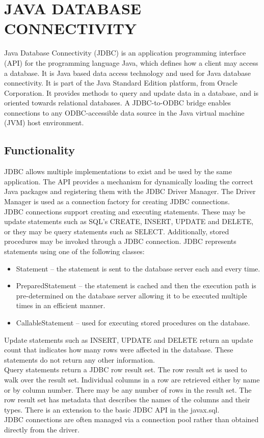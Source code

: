 \chapter{JAVA DATABASE CONNECTIVITY}
Java Database Connectivity (JDBC) is an application programming interface (API) for the programming language Java, which defines how a client may access a database. It is Java based data access technology and used for Java database connectivity. It is part of the Java Standard Edition platform, from Oracle Corporation. It provides methods to query and update data in a database, and is oriented towards relational databases. A JDBC-to-ODBC bridge enables connections to any ODBC-accessible data source in the Java virtual machine (JVM) host environment.\\
\section{Functionality}
JDBC allows multiple implementations to exist and be used by the same application. The API provides a mechanism for dynamically loading the correct Java packages and registering them with the JDBC Driver Manager. The Driver Manager is used as a connection factory for creating JDBC connections.\\
JDBC connections support creating and executing statements. These may be update statements such as SQL's CREATE, INSERT, UPDATE and DELETE, or they may be query statements such as SELECT. Additionally, stored procedures may be invoked through a JDBC connection. JDBC represents statements using one of the following classes:
\begin{itemize}
\item{Statement – the statement is sent to the database server each and every time.}
\item{PreparedStatement – the statement is cached and then the execution path is pre-determined on the database server allowing it to be executed multiple times in an efficient manner.}
\item{CallableStatement – used for executing stored procedures on the database.}
\end{itemize}
Update statements such as INSERT, UPDATE and DELETE return an update count that indicates how many rows were affected in the database. These statements do not return any other information.\\
Query statements return a JDBC row result set. The row result set is used to walk over the result set. Individual columns in a row are retrieved either by name or by column number. There may be any number of rows in the result set. The row result set has metadata that describes the names of the columns and their types.
There is an extension to the basic JDBC API in the javax.sql.\\
JDBC connections are often managed via a connection pool rather than obtained directly from the driver.\\
